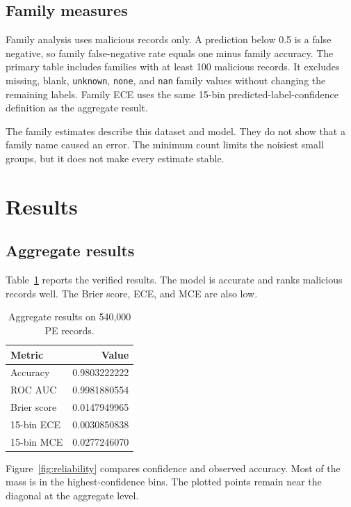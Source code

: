 \documentclass[11pt]{article}
\newcommand{\code}[1]{\texttt{#1}}
\begin{document}
\subsection{Family measures}

Family analysis uses malicious records only. A prediction below 0.5 is a false
negative, so family false-negative rate equals one minus family accuracy. The
primary table includes families with at least 100 malicious records. It excludes
missing, blank, \code{unknown}, \code{none}, and \code{nan} family values
without changing the remaining labels. Family ECE uses the same 15-bin
predicted-label-confidence definition as the aggregate result.

The family estimates describe this dataset and model. They do not show that a
family name caused an error. The minimum count limits the noisiest small groups,
but it does not make every estimate stable.

\section{Results}

\subsection{Aggregate results}

Table~\ref{tab:aggregate} reports the verified results. The model is accurate
and ranks malicious records well. The Brier score, ECE, and MCE are also low.

\begin{table}[!htbp]
\centering
\caption{Aggregate results on 540,000 PE records.}
\label{tab:aggregate}
\begin{tabular}{lr}
\toprule
Metric & Value \\
\midrule
Accuracy & 0.9803222222 \\
ROC AUC & 0.9981880554 \\
Brier score & 0.0147949965 \\
15-bin ECE & 0.0030850838 \\
15-bin MCE & 0.0277246070 \\
\bottomrule
\end{tabular}
\end{table}

Figure~\ref{fig:reliability} compares confidence and observed accuracy. Most of
the mass is in the highest-confidence bins. The plotted points remain near the
diagonal at the aggregate level.
\end{document}

